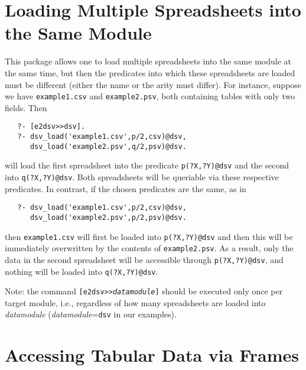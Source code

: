 \section{Loading Multiple Spreadsheets into the Same Module}
This package allows one to load multiple spreadsheets into the same \ERGO
module at the same time, but then the predicates into which these
spreadsheets are loaded must be different (either the name or the arity
must differ). For instance,
suppose we have \texttt{example1.csv} and \texttt{example2.psv}, both
containing tables with only two fields. Then
\begin{verbatim}
   ?- [e2dsv>>dsv].
   ?- dsv_load('example1.csv',p/2,csv)@dsv,
      dsv_load('example2.psv',q/2,psv)@dsv.
\end{verbatim}
will load the first spreadsheet into the predicate \texttt{p(?X,?Y)@dsv}
and the second into \texttt{q(?X,?Y)@dsv}. Both spreadsheets will be
queriable via these respective predicates. In contrast, if the chosen
predicates are the same, as in
\begin{verbatim}
   ?- dsv_load('example1.csv',p/2,csv)@dsv,
      dsv_load('example2.psv',p/2,psv)@dsv.
\end{verbatim}
then \texttt{example1.csv} will  first be loaded into \texttt{p(?X,?Y)@dsv}
and then this will be immediately overwritten by the contents of
\texttt{example2.psv}. As a result, only the data in the second spreadsheet
will be accessible through \texttt{p(?X,?Y)@dsv}, and nothing will be
loaded into \texttt{q(?X,?Y)@dsv}.

Note: the command \texttt{[e2dsv>>\textnormal{\emph{datamodule}}]} should
be executed only once per target module, i.e., regardless of how many
spreadsheets are loaded into \emph{datamodule}
(\emph{datamodule}=\texttt{dsv} in our examples).

\section{Accessing Tabular Data via Frames}

